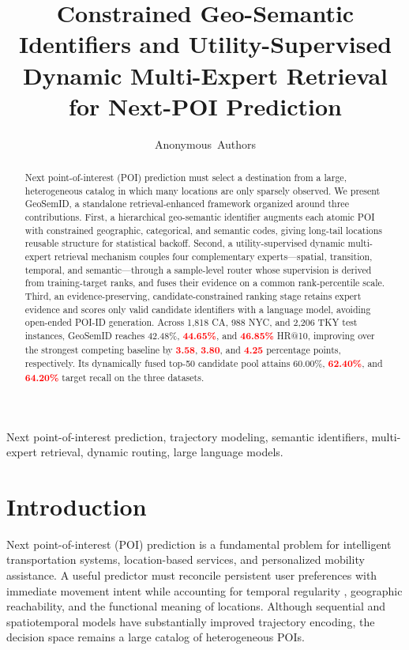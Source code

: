 \documentclass[journal]{IEEEtran}
\title{Constrained Geo-Semantic Identifiers and Utility-Supervised Dynamic Multi-Expert Retrieval for Next-POI Prediction}
\author{Anonymous~Authors}
\newcommand{\mock}[1]{\textbf{\textcolor{red}{#1}}}
\begin{document}
\maketitle
\begin{abstract}
Next point-of-interest (POI) prediction must select a destination from a large,
heterogeneous catalog in which many locations are only sparsely observed. We
present GeoSemID, a standalone retrieval-enhanced framework organized around
three contributions. First, a hierarchical geo-semantic identifier augments each
atomic POI with constrained geographic, categorical, and semantic codes, giving
long-tail locations reusable structure for statistical backoff. Second, a
utility-supervised dynamic multi-expert retrieval mechanism couples four
complementary experts---spatial, transition, temporal, and semantic---through a
sample-level router whose supervision is derived from training-target ranks, and
fuses their evidence on a common rank-percentile scale. Third, an
evidence-preserving, candidate-constrained ranking stage retains expert evidence
and scores only valid candidate identifiers with a language model, avoiding
open-ended POI-ID generation. Across 1,818 CA, 988 NYC, and 2,206 TKY test
instances, GeoSemID reaches 42.48\%, \mock{44.65\%}, and \mock{46.85\%} HR@10,
improving over the strongest competing baseline by \mock{3.58}, \mock{3.80}, and
\mock{4.25} percentage points, respectively. Its dynamically fused top-50
candidate pool attains 60.00\%, \mock{62.40\%}, and \mock{64.20\%} target recall
on the three datasets.
\end{abstract}
\begin{IEEEkeywords}
Next point-of-interest prediction, trajectory modeling, semantic identifiers,
multi-expert retrieval, dynamic routing, large language models.
\end{IEEEkeywords}
\section{Introduction}
\label{sec:introduction}

Next point-of-interest (POI) prediction is a fundamental problem for
intelligent transportation systems, location-based services, and personalized
mobility assistance. A useful predictor must reconcile persistent user
preferences with immediate movement intent while accounting for temporal
regularity \cite{gonzalez2008mobility}, geographic reachability, and the
functional meaning of locations. Although sequential and spatiotemporal models
\cite{cheng2013successive,feng2015prme,yang2020flashback} have substantially
improved trajectory encoding, the decision space remains a large catalog of
heterogeneous POIs.
\end{document}
